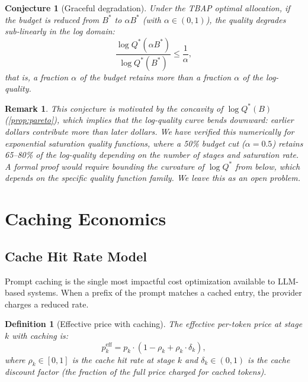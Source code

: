 \documentclass[11pt, a4paper, logo, copyright]{googledeepmind}
\newtheorem{definition}{Definition}[section]
\newtheorem{conjecture}{Conjecture}[section]
\newtheorem*{remark}{Remark}
\begin{document}
\begin{conjecture}[Graceful degradation]\label{conj:graceful}
Under the TBAP optimal allocation, if the budget is reduced from $B^*$ to $\alpha B^*$ (with $\alpha \in (0,1)$), the quality degrades sub-linearly in the log domain:
\begin{equation}\label{eq:graceful}
    \frac{\log Q^*(\alpha B^*)}{\log Q^*(B^*)} \leq \frac{1}{\alpha},
\end{equation}
that is, a fraction $\alpha$ of the budget retains more than a fraction $\alpha$ of the log-quality.
\end{conjecture}

\begin{remark}
This conjecture is motivated by the concavity of $\log Q^*(B)$ (\cref{prop:pareto}), which implies that the log-quality curve bends downward: earlier dollars contribute more than later dollars. We have verified this numerically for exponential saturation quality functions, where a 50\% budget cut ($\alpha = 0.5$) retains 65--80\% of the log-quality depending on the number of stages and saturation rate. A formal proof would require bounding the curvature of $\log Q^*$ from below, which depends on the specific quality function family. We leave this as an open problem.
\end{remark}


\section{Caching Economics}\label{sec:caching}

\subsection{Cache Hit Rate Model}

Prompt caching is the single most impactful cost optimization available to LLM-based systems. When a prefix of the prompt matches a cached entry, the provider charges a reduced rate.

\begin{definition}[Effective price with caching]\label{def:cache-price}
The effective per-token price at stage $k$ with caching is:
\begin{equation}\label{eq:cache-price}
    p_k^{\text{eff}} = p_k \cdot \left(1 - \rho_k + \rho_k \cdot \delta_k\right),
\end{equation}
where $\rho_k \in [0,1]$ is the cache hit rate at stage $k$ and $\delta_k \in (0,1)$ is the cache discount factor (the fraction of the full price charged for cached tokens).
\end{definition}
\end{document}
